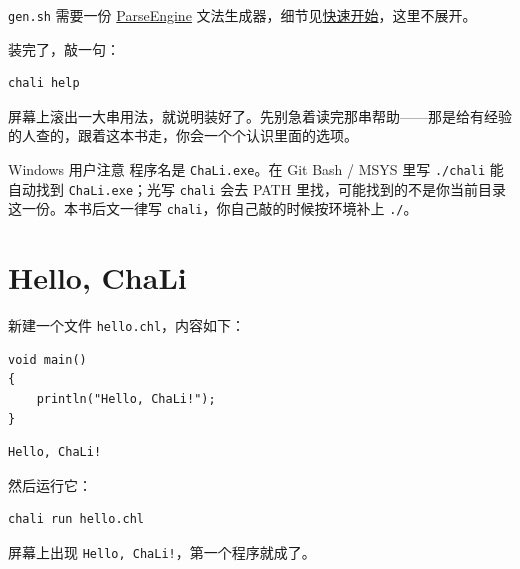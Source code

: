 \texttt{gen.\allowbreak{}sh} 需要一份 \href{https://github.com/rabbitc999/ParseEngine}{ParseEngine} 文法生成器，细节见\href{https://gitee.com/rabbitc999/chali/blob/master/doc/01-quickstart.md#1-安装}{快速开始}，这里不展开。

装完了，敲一句：

\par
\medskip
\begin{lstlisting}[style=sh]
chali help
\end{lstlisting}
\par
\medskip

屏幕上滚出一大串用法，就说明装好了。先别急着读完那串帮助——那是给有经验的人查的，跟着这本书走，你会一个个认识里面的选项。

\begin{tip}{Windows 用户注意}
程序名是 \texttt{Cha\allowbreak{}Li.\allowbreak{}exe}。在 Git Bash / MSYS 里写 \texttt{.\allowbreak{}/\allowbreak{}chali} 能自动找到 \texttt{Cha\allowbreak{}Li.\allowbreak{}exe}；光写 \texttt{chali} 会去 PATH 里找，可能找到的不是你当前目录这一份。本书后文一律写 \texttt{chali}，你自己敲的时候按环境补上 \texttt{.\allowbreak{}/\allowbreak{}}。
\end{tip}

\section{Hello, ChaLi}

新建一个文件 \texttt{hello.\allowbreak{}chl}，内容如下：

\par
\medskip
\begin{lstlisting}[style=chali]
void main()
{
    println("Hello, ChaLi!");
}
\end{lstlisting}
\par
\medskip

\par
\medskip
\begin{lstlisting}[style=out]
Hello, ChaLi!
\end{lstlisting}
\par
\medskip

然后运行它：

\par
\medskip
\begin{lstlisting}[style=sh]
chali run hello.chl
\end{lstlisting}
\par
\medskip

屏幕上出现 \texttt{Hello,\allowbreak{} Cha\allowbreak{}Li!}，第一个程序就成了。

